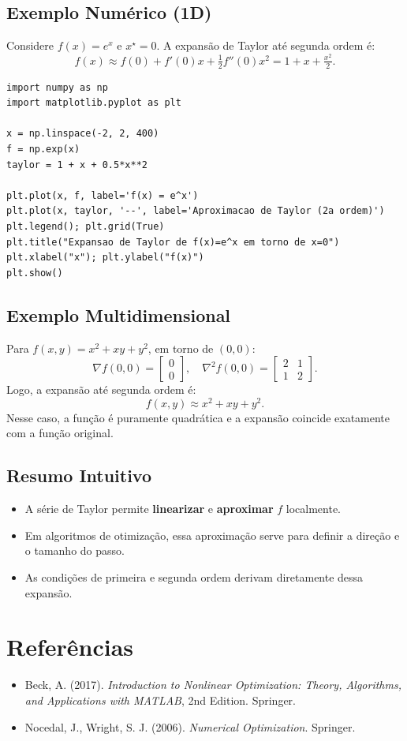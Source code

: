 \documentclass[9pt,a4paper]{extarticle}
\begin{document}
\subsection*{Exemplo Numérico (1D)}
Considere $f(x) = e^x$ e $x^\star = 0$.  
A expansão de Taylor até segunda ordem é:
\[
f(x) \approx f(0) + f'(0)x + \tfrac{1}{2} f''(0)x^2 = 1 + x + \tfrac{x^2}{2}.
\]

\begin{lstlisting}
import numpy as np
import matplotlib.pyplot as plt

x = np.linspace(-2, 2, 400)
f = np.exp(x)
taylor = 1 + x + 0.5*x**2

plt.plot(x, f, label='f(x) = e^x')
plt.plot(x, taylor, '--', label='Aproximacao de Taylor (2a ordem)')
plt.legend(); plt.grid(True)
plt.title("Expansao de Taylor de f(x)=e^x em torno de x=0")
plt.xlabel("x"); plt.ylabel("f(x)")
plt.show()
\end{lstlisting}

\subsection*{Exemplo Multidimensional}
Para $f(x,y) = x^2 + xy + y^2$, em torno de $(0,0)$:
\[
\nabla f(0,0) =
\begin{bmatrix} 0 \\ 0 \end{bmatrix},
\quad
\nabla^2 f(0,0) =
\begin{bmatrix}
2 & 1 \\
1 & 2
\end{bmatrix}.
\]
Logo, a expansão até segunda ordem é:
\[
f(x,y) \approx x^2 + xy + y^2.
\]
Nesse caso, a função é puramente quadrática e a expansão coincide exatamente com a função original.

\subsection*{Resumo Intuitivo}
\begin{itemize}
    \item A série de Taylor permite \textbf{linearizar} e \textbf{aproximar} $f$ localmente.
    \item Em algoritmos de otimização, essa aproximação serve para definir a direção e o tamanho do passo.
    \item As condições de primeira e segunda ordem derivam diretamente dessa expansão.
\end{itemize}

\section*{Referências}
\begin{itemize}
    \item Beck, A. (2017). \textit{Introduction to Nonlinear Optimization: Theory, Algorithms, and Applications with MATLAB}, 2nd Edition. Springer.
    \item Nocedal, J., Wright, S. J. (2006). \textit{Numerical Optimization}. Springer.
\end{itemize}
\end{document}

